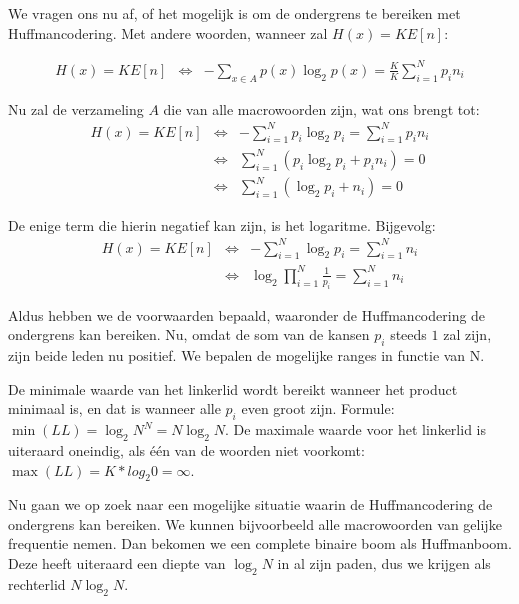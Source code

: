 \documentclass[]{article}
\begin{document}
\begin{section}
\begin{subsection}
        We vragen ons nu af, of het mogelijk is om de ondergrens te
        bereiken met Huffmancodering. Met andere woorden, wanneer zal
        $H(x) = KE[n]$:

        \begin{eqnarray*}
            H(x) = KE[n]
            & \Leftrightarrow & - \sum_{x \in A}{p(x) \log_2{p(x)}}
                = \frac{K}{K} \sum_{i = 1}^{N}{p_i n_i}
        \end{eqnarray*}

        Nu zal de verzameling $A$ die van alle macrowoorden zijn,
        wat ons brengt tot:
        \begin{eqnarray*}
            H(x) = KE[n]
            & \Leftrightarrow & - \sum_{i = 1}^{N}{p_i \log_2{p_i}}
                = \sum_{i = 1}^{N}{p_i n_i} \\
            & \Leftrightarrow & \sum_{i = 1}^{N}(p_i \log_2{p_i}
                + p_i n_i) = 0 \\
            & \Leftrightarrow & \sum_{i = 1}^{N}(\log_2{p_i} + n_i) = 0
        \end{eqnarray*}

        De enige term die hierin negatief kan zijn, is het logaritme.
        Bijgevolg:
        \begin{eqnarray*}
            H(x) = KE[n] & \Leftrightarrow &
            - \sum_{i = 1}^{N}{\log_2 p_i} = \sum_{i = 1}^{N} n_i
            \\ & \Leftrightarrow &
            \log_2 {\prod_{i = 1}^{N}{\frac{1}{p_i}}}
                = \sum_{i = 1}^{N} n_i
        \end{eqnarray*}

        Aldus hebben we de voorwaarden bepaald, waaronder de
        Huffmancodering de ondergrens kan bereiken. Nu, omdat de som
        van de kansen $p_i$ steeds $1$ zal zijn, zijn beide leden nu
        positief. We bepalen de mogelijke ranges in functie van N.

        De minimale waarde van het linkerlid wordt bereikt wanneer het
        product minimaal is, en dat is wanneer alle $p_i$ even groot
        zijn. Formule: $\min(LL) = \log_2{N^N} = N \log_2{N}$. De
        maximale waarde voor het linkerlid is uiteraard oneindig, als
        \'e\'en van de woorden niet voorkomt: $ \max(LL) = K*log_2{0}
        = \infty $.

        Nu gaan we op zoek naar een mogelijke situatie waarin de
        Huffmancodering de ondergrens kan bereiken. We kunnen
        bijvoorbeeld alle macrowoorden van gelijke frequentie nemen.
        Dan bekomen we een complete binaire boom als Huffmanboom. Deze
        heeft uiteraard een diepte van $\log_2 N$ in al zijn paden,
        dus we krijgen als rechterlid $N \log_2 N$.


\end{subsection}
\end{section}
\end{document}
